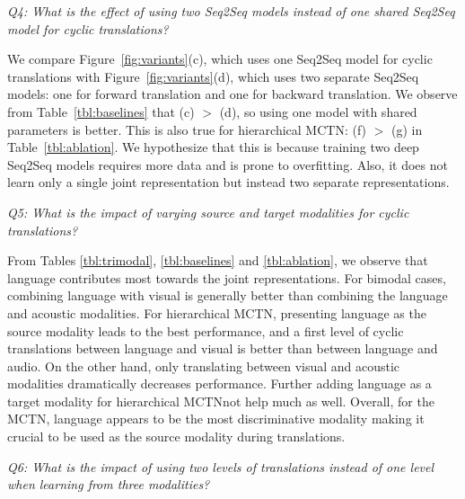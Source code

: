 \documentclass[letterpaper]{article} %
\newcommand{\ours}{MCTN}
\begin{document}





\textit{Q4: What is the effect of using two Seq2Seq models instead of one shared Seq2Seq model for cyclic translations?}

We compare Figure~\ref{fig:variants}(c), which uses one Seq2Seq model for cyclic translations with Figure~\ref{fig:variants}(d), which uses two separate Seq2Seq models: one for forward translation and one for backward translation. We observe from Table~\ref{tbl:baselines} that (c) $>$ (d), so using one model with shared parameters is better. This is also true for hierarchical \ours: (f) $>$ (g) in Table~\ref{tbl:ablation}. We hypothesize that this is because training two deep Seq2Seq models requires more data and is prone to overfitting. 
Also, it does not learn only a single joint representation but instead two separate representations. 

\textit{Q5: What is the impact of varying source and target modalities for cyclic translations?}

From Tables \ref{tbl:trimodal}, \ref{tbl:baselines} and \ref{tbl:ablation}, we observe that language contributes most towards the joint representations. For bimodal cases, combining language with visual is generally better than combining the language and acoustic modalities. For hierarchical \ours, presenting language as the source modality leads to the best performance, and a first level of cyclic translations between language and visual is better than between language and audio. On the other hand, only translating between visual and acoustic modalities dramatically decreases performance. Further adding language as a target modality for hierarchical \ours \will not help much as well. Overall, for the \ours, language appears to be the most discriminative modality making it crucial to be used as the source modality during translations.

\textit{Q6: What is the impact of using two levels of translations instead of one level when learning from three modalities?}
\end{document}
